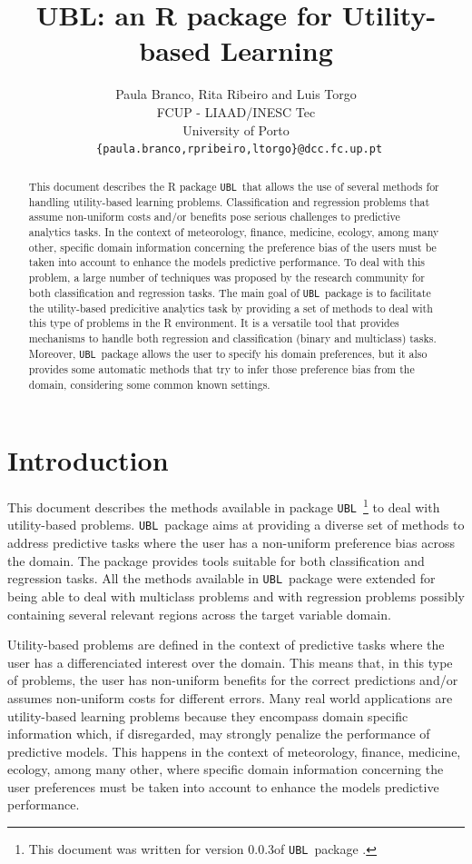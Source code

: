 \documentclass[10pt,a4paper]{article}\usepackage[]{graphicx}\usepackage[]{color}
\author{Paula Branco, Rita Ribeiro and Luis Torgo\\FCUP - LIAAD/INESC Tec\\University of Porto\\
  \texttt{ \{paula.branco,rpribeiro,ltorgo\}@dcc.fc.up.pt}}
\title{UBL: an R package for Utility-based Learning}
\newcommand{\pUBL}{package \texttt{UBL}\ }
\newcommand{\UBLp}{\texttt{UBL}\ package  }
\newcommand{\version}{0.0.3}
\begin{document}
\maketitle


\begin{abstract}
  
  This document describes the R \pUBL that allows the use of several methods for handling utility-based learning problems. Classification and regression problems that assume non-uniform costs and/or benefits pose serious challenges to predictive analytics tasks. In the context of meteorology, finance, medicine, ecology, among many other, specific domain information concerning the preference bias of the users must be taken into account to enhance the models predictive performance. To deal with this problem, a large number of techniques was proposed by the research community for both classification and regression tasks. 
  The main goal of \UBLp is to facilitate the utility-based predicitive analytics task by providing a set of methods to deal with this type of problems in the R environment. It is a versatile tool that provides mechanisms to handle both regression and classification (binary and multiclass) tasks. Moreover, \UBLp allows the user to specify his domain preferences, but it also provides some automatic methods that try to infer those preference bias from the domain, considering some common known settings. 

\end{abstract}

\section{Introduction}

This document describes the methods available in \pUBL \footnote{This document was written for version \version of \UBLp.} to deal with utility-based problems. \UBLp aims at providing a diverse set of methods to address predictive tasks where the user has a non-uniform preference bias across the domain. The package provides tools suitable for both classification and regression tasks. All the methods available in \UBLp were extended for being able to deal with multiclass problems and with regression problems possibly containing several relevant regions across the target variable domain. 


Utility-based problems are defined in the context of predictive tasks where the user has a differenciated interest over the domain. This means that, in this type of problems, the user has non-uniform benefits for the correct predictions and/or assumes non-uniform costs for different errors. Many real world applications are utility-based learning problems because they encompass domain specific information which, if disregarded, may strongly penalize the performance of predictive models. This happens in the context of meteorology, finance, medicine, ecology, among many other, where specific domain information concerning the user preferences must be taken into account to enhance the models predictive performance.
\end{document}

